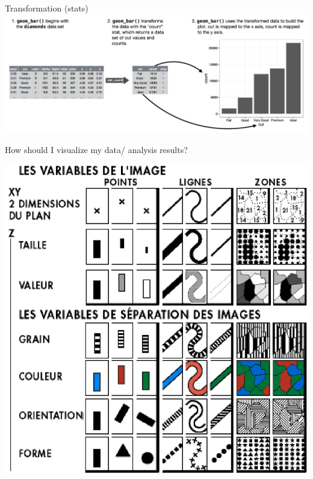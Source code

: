 \documentclass[xcolor=table,aspectratio=169]{beamer}
\newcommand{\referto}[1]{\hfill{\scriptsize{\emph{\color{gray}{#1}}}}}
\begin{document}
\begin{frame}{Transformation (stats)}
  \includegraphics[width=\textwidth]{pics/hadley-stats.png}
\end{frame}

\begin{frame}
  How should I visualize my data/ analysis results?
\end{frame}

\begin{frame}
  \includegraphics[height=\textheight]{pics/bertin.png} \referto{Jacques Bertin (1967) Sémiologie graphique}
\end{frame}
\end{document}
